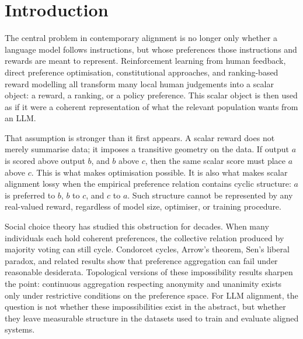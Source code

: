 \documentclass[10pt]{article}
\theoremstyle{definition}
\theoremstyle{remark}
\begin{document}
\section*{}
\vspace{-1em}

\section*{Introduction}

The central problem in contemporary alignment is no longer only whether a language model follows instructions, but whose preferences those instructions and rewards are meant to represent. Reinforcement learning from human feedback\cite{ouyang2022,stiennon2020}, direct preference optimisation\cite{rafailov2023}, constitutional approaches\cite{bai2022}, and ranking-based reward modelling all transform many local human judgements into a scalar object: a reward, a ranking, or a policy preference. This scalar object is then used as if it were a coherent representation of what the relevant population wants from an LLM.

That assumption is stronger than it first appears. A scalar reward does not merely summarise data; it imposes a transitive geometry on the data. If output $a$ is scored above output $b$, and $b$ above $c$, then the same scalar score must place $a$ above $c$. This is what makes optimisation possible. It is also what makes scalar alignment lossy when the empirical preference relation contains cyclic structure: $a$ is preferred to $b$, $b$ to $c$, and $c$ to $a$. Such structure cannot be represented by any real-valued reward, regardless of model size, optimiser, or training procedure.

Social choice theory has studied this obstruction for decades. When many individuals each hold coherent preferences, the collective relation produced by majority voting can still cycle. Condorcet cycles\cite{black1948}, Arrow's theorem, Sen's liberal paradox, and related results show that preference aggregation can fail under reasonable desiderata\cite{arrow1951,sen1970}. Topological versions of these impossibility results sharpen the point: continuous aggregation respecting anonymity and unanimity exists only under restrictive conditions on the preference space\cite{chichilnisky1980,chichilnisky1983,baryshnikov1993}. For LLM alignment, the question is not whether these impossibilities exist in the abstract, but whether they leave measurable structure in the datasets used to train and evaluate aligned systems.
\end{document}
